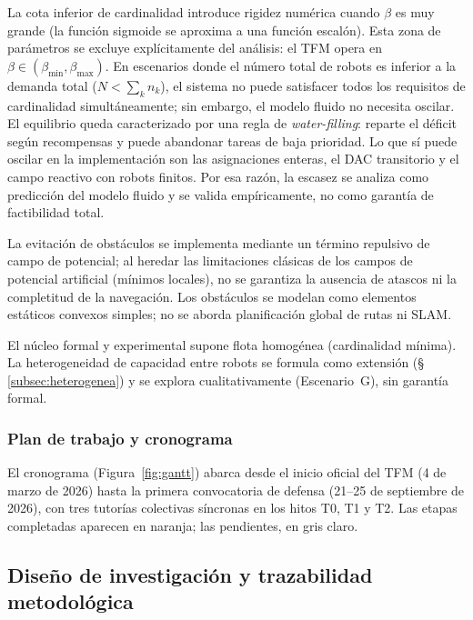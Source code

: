 La cota inferior de cardinalidad introduce rigidez numérica cuando $\beta$ es
muy grande (la función sigmoide se aproxima a una función escalón). Esta zona
de parámetros se excluye explícitamente del análisis: el TFM opera en
$\beta \in (\beta_{\min}, \beta_{\max})$. En escenarios donde el número total de
robots es inferior a la demanda total ($N < \sum_k n_k$), el sistema no puede
satisfacer todos los requisitos de cardinalidad simultáneamente; sin embargo, el
modelo fluido no necesita oscilar. El equilibrio queda caracterizado por una regla de
\emph{water-filling}: reparte el déficit según recompensas y puede abandonar tareas de
baja prioridad. Lo que sí puede oscilar en la implementación son las asignaciones
enteras, el DAC transitorio y el campo reactivo con robots finitos. Por esa razón, la
escasez se analiza como predicción del modelo fluido y se valida empíricamente, no como
garantía de factibilidad total.

La evitación de obstáculos se implementa mediante un término repulsivo de campo de
potencial; al heredar las limitaciones clásicas de los campos de potencial artificial
(mínimos locales), no se garantiza la ausencia de atascos ni la completitud de la
navegación. Los obstáculos se modelan como elementos estáticos convexos simples; no se
aborda planificación global de rutas ni SLAM.

El núcleo formal y experimental supone flota homogénea (cardinalidad mínima). La
heterogeneidad de capacidad entre robots se formula como extensión
(\S\,\ref{subsec:heterogenea}) y se explora cualitativamente (Escenario~G), sin
garantía formal.

\subsubsection{Plan de trabajo y cronograma}
\label{sec:cronograma}

El cronograma (Figura~\ref{fig:gantt}) abarca desde el inicio oficial del TFM
(4 de marzo de 2026) hasta la primera convocatoria de defensa (21--25 de
septiembre de 2026), con tres tutorías colectivas síncronas en los hitos T0,
T1 y T2. Las etapas completadas aparecen en naranja; las pendientes, en gris claro.





\subsection{Diseño de investigación y trazabilidad metodológica}
\label{subsec:diseno_investigacion}

